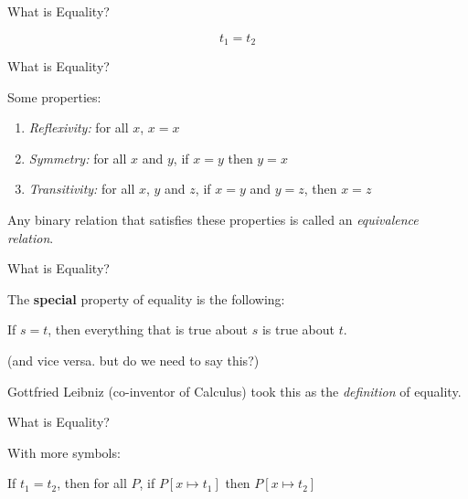 \documentclass[xetex,aspectratio=169,14pt,hyperref={pdfpagelabels=true,pdflang={en-GB}}]{beamer}
\begin{document}
\frame{\titlepage}


\begin{frame}
  {What is Equality?}

  \begin{displaymath}
    t_1 = t_2
  \end{displaymath}
\end{frame}

\begin{frame}
  {What is Equality?}

  Some properties:
  \begin{enumerate}
  \item \emph{Reflexivity: } for all $x$, $x = x$
  \item \emph{Symmetry: } for all $x$ and $y$, if $x = y$ then $y = x$
  \item \emph{Transitivity: } for all $x$, $y$ and $z$, if $x = y$ and $y = z$, then $x = z$
  \end{enumerate}

  \pause
  \bigskip

  Any binary relation that satisfies these properties is called an
  \emph{equivalence relation}.
\end{frame}

\begin{frame}
  {What is Equality?}

  The \textbf{special} property of equality is the following:

  \bigskip

  \begin{center}
    If $s = t$, then everything that is true about $s$ is true about $t$.
  \end{center}

  \pause
  \bigskip

  \textcolor{black!60}{(and vice versa. but do we need to say this?)}

  \pause
  \bigskip

  Gottfried Leibniz (co-inventor of Calculus) took this as the
  \emph{definition} of equality.
\end{frame}

\begin{frame}
  {What is Equality?}

  With more symbols:
  \begin{center}
    If $t_1 = t_2$, then for all $P$, if $P[x \mapsto t_1]$ then $P[x \mapsto t_2]$
  \end{center}

\end{frame}
\end{document}
